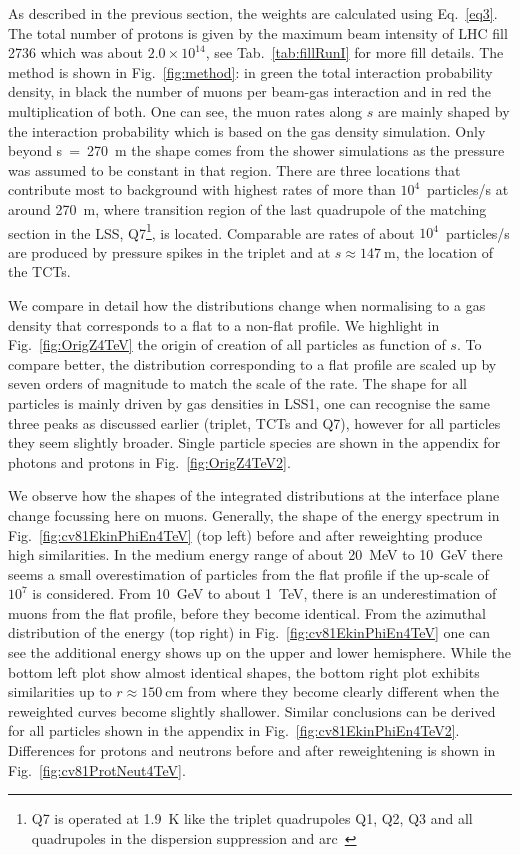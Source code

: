 As described in the previous section, the weights are calculated using Eq.~\ref{eq3}. The total number of protons is given by the maximum beam intensity of LHC fill 2736 which was about $2.0 \times 10^{14}$, see Tab.~\ref{tab:fillRunI} for more fill details. The method is shown in Fig.~\ref{fig:method}: in green the total interaction probability density, in black the number of muons per beam-gas interaction and in red the multiplication of both. One can see, the muon rates along $s$ are mainly shaped by the interaction probability which is based on the gas density simulation. Only beyond s~=~270~m the shape comes from the shower simulations as the pressure was assumed to be constant in that region. There are three locations that contribute most to background with highest rates of more than $10^4$~particles/s at around 270~m, where transition region of the last quadrupole of the matching section in the LSS, Q7\footnote{Q7 is operated at 1.9~K like the triplet quadrupoles Q1, Q2, Q3 and all quadrupoles in the dispersion suppression and arc~\cite{LHCDesignRep}}, is located. Comparable are rates of about $10^4$~particles/s are produced by pressure spikes in the triplet and at $s \approx 147~$m, the location of the TCTs.

We compare in detail how the distributions change when normalising to a gas density that corresponds to a flat to a non-flat profile. We highlight in Fig.~\ref{fig:OrigZ4TeV} the origin of creation of all particles as function of $s$. To compare better, the distribution corresponding to a flat profile are scaled up by seven orders of magnitude to match the scale of the rate. The shape for all particles is mainly driven by gas densities in LSS1, one can recognise the same three peaks as discussed earlier (triplet, TCTs and Q7), however for all particles they seem slightly broader. Single particle species are shown in the appendix for photons and protons in Fig.~\ref{fig:OrigZ4TeV2}. 

We observe how the shapes of the integrated distributions at the interface plane change focussing here on muons. Generally, the shape of the energy spectrum in Fig.~\ref{fig:cv81EkinPhiEn4TeV} (top left) before and after reweighting produce high similarities. In the medium energy range of about 20~MeV to 10~GeV there seems a small overestimation of particles from the flat profile if the up-scale of $10^{7}$ is considered. From 10~GeV to about 1~TeV, there is an underestimation of muons from the flat profile, before they become identical. From the azimuthal distribution of the energy (top right) in Fig.~\ref{fig:cv81EkinPhiEn4TeV} one can see the additional energy shows up on the upper and lower hemisphere. While the bottom left plot show almost identical shapes, the bottom right plot exhibits similarities up to $r \approx 150~$cm from where they become clearly different when the reweighted curves become slightly shallower. Similar conclusions can be derived for all particles shown in the appendix in Fig.~\ref{fig:cv81EkinPhiEn4TeV2}. Differences for protons and neutrons before and after reweightening is shown in Fig.~\ref{fig:cv81ProtNeut4TeV}.

